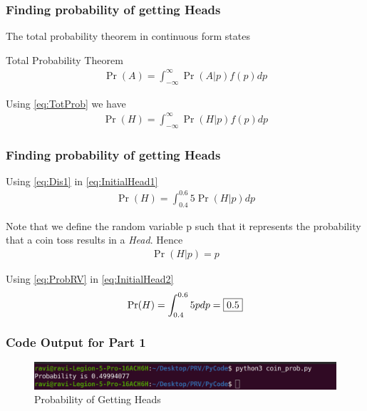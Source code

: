 \documentclass{beamer}
\begin{document}
\begin{frame}
  \frametitle{Finding probability of getting Heads}
  The total probability theorem in continuous form states
  \begin{block}{Total Probability Theorem}
    \begin{align}
      \Pr(A) = \int_{-\infty}^{\infty}\Pr(A|p)f(p)dp
      \label{eq:TotProb}
    \end{align}
  \end{block}

  Using
  \eqref{eq:TotProb}
  we have
  \begin{align}
    \Pr(H) = \int_{-\infty}^{\infty} \Pr(H|p)f(p) dp
    \label{eq:InitialHead1}
  \end{align}
  
\end{frame}

\begin{frame}
  \frametitle{Finding probability of getting Heads}

  Using
  \eqref{eq:Dis1}
  in
  \eqref{eq:InitialHead1}
  \begin{align}
    \Pr(H) = \int_{0.4}^{0.6} 5\Pr(H|p) dp
    \label{eq:InitialHead2}
  \end{align}

  Note that we define the random variable p such that it represents the probability that a coin toss results in a \emph{Head}. Hence
  \begin{align}
    \Pr(H|p) = p
    \label{eq:ProbRV}
  \end{align}

  Using
  \eqref{eq:ProbRV}
  in
  \eqref{eq:InitialHead2}
  \begin{align}
    \Pr(H) = \int_{0.4}^{0.6} 5p dp = \fbox{0.5}
    \label{eq:InitialHeadProb}
  \end{align}
    
\end{frame}

\begin{frame}
  \frametitle{Code Output for Part 1}
  \begin{figure}[!ht]
    \centering
    \includegraphics[width=0.75\columnwidth]{../Figures/coin_prob.png}
    \caption{Probability of Getting Heads}
    \label{fig:GettingHeads}
  \end{figure}
\end{frame}
\end{document}
